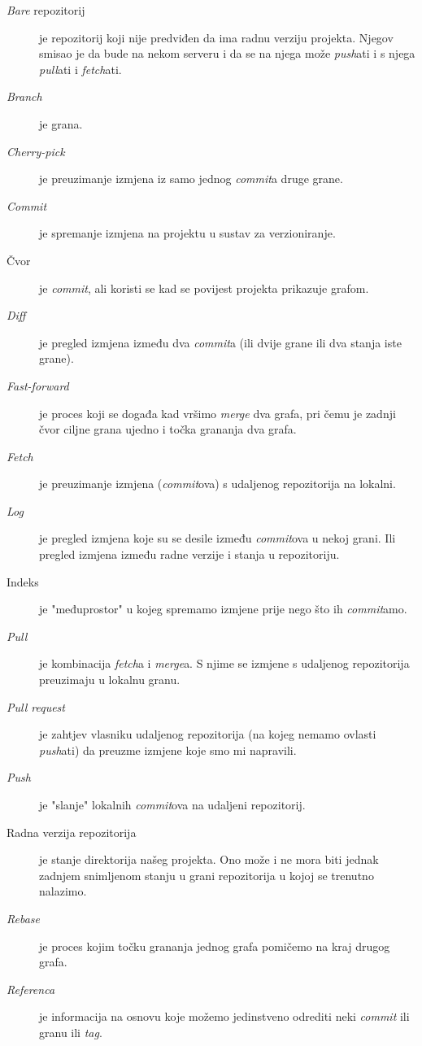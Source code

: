 \begin{description}
    \item[\emph{Bare} repozitorij] je repozitorij koji nije predviđen da ima radnu verziju projekta. Njegov smisao je da bude na nekom serveru i da se na njega može \emph{push}ati i s njega \emph{pull}ati i \emph{fetch}ati.
    \item[\emph{Branch}] je grana.
    \item[\emph{Cherry-pick}] je preuzimanje izmjena iz samo jednog \emph{commit}a druge grane.
    \item[\emph{Commit}] je spremanje izmjena na projektu u sustav za verzioniranje.
    \item[Čvor] je \emph{commit}, ali koristi se kad se povijest projekta prikazuje grafom.
    \item[\emph{Diff}] je pregled izmjena između dva \emph{commit}a (ili dvije grane ili dva stanja iste grane).
    \item[\emph{Fast-forward}] je proces koji se događa kad vršimo \emph{merge} dva grafa, pri čemu je zadnji čvor ciljne grana ujedno i točka grananja dva grafa.
    \item[\emph{Fetch}] je preuzimanje izmjena (\emph{commit}ova) s udaljenog repozitorija na lokalni.
    \item[\emph{Log}] je pregled izmjena koje su se desile između \emph{commit}ova u nekoj grani. Ili pregled izmjena između radne verzije i stanja u repozitoriju.
    \item[Indeks] je "međuprostor" u kojeg spremamo izmjene prije nego što ih \emph{commit}amo.
    \item[\emph{Pull}] je kombinacija \emph{fetch}a i \emph{merge}a. S njime se izmjene s udaljenog repozitorija preuzimaju u lokalnu granu.
    \item[\emph{Pull request}] je zahtjev vlasniku udaljenog repozitorija (na kojeg nemamo ovlasti \emph{push}ati) da preuzme izmjene koje smo mi napravili.
    \item[\emph{Push}] je "slanje" lokalnih \emph{commit}ova na udaljeni repozitorij.
    \item[Radna verzija repozitorija] je stanje direktorija našeg projekta. Ono može i ne mora biti jednak zadnjem snimljenom stanju u grani repozitorija u kojoj se trenutno nalazimo.
    \item[\emph{Rebase}] je proces kojim točku grananja jednog grafa pomičemo na kraj drugog grafa.
    \item[\emph{Referenca}] je informacija na osnovu koje možemo jedinstveno odrediti neki \emph{commit} ili granu ili \emph{tag}.

\end{description}
